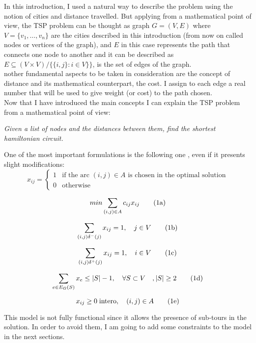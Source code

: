 In this introduction, I used a natural way to describe the problem using the notion of cities and distance travelled. But applying from a mathematical point of view, the TSP problem can be thought as graph $G=(V,E)$ where $V=\{v_1, \dots , v_n\}$ are the cities described in this introduction (from now on called nodes or vertices of the graph), and $E$ in this case represents the path that connects one node to another and it can be described as $E \subseteq (V \times V) / \{\{i, j\}	:i \in V\}\}$, is the set of edges of the graph.\\
nother fundamental aspects to be taken in consideration are the concept of distance and its mathematical counterpart, the cost. I assign to each edge a real number that will be used to give weight (or cost) to the path chosen.\\
Now that I have introduced the main concepts I can explain the TSP problem from a mathematical point of view:
\begin{displayquote}
	\textit{Given a list of nodes and the distances between them, find the shortest hamiltonian circuit.}
\end{displayquote}
One of the most important formulations is the following one \cite{ro1}, even if it presents slight modifications:
	\begin{equation}
	x_{ij}=
	\begin{cases}
	1 & \text{if the arc $(i, j) \in A$ is chosen in the optimal solution}\\
	0 & \text{otherwise}
	\end{cases}
	\end{equation}
	
	\begin{equation}
	\label{eqn:cost}
	min\sum_{(i,j)\in A}c_{ij}x_{ij}
	\stepcounter{equation}\tag{{\theequation}a}
	\end{equation}
	
	\begin{equation}
	\label{eqn:in}
	\sum_{(i,j)\delta^-(j)}x_{ij}=1, \quad j\in V
	\tag{{\theequation}b}
	\end{equation}
	
	\begin{equation}
	\label{eqn:out}
	\sum_{(i,j)\delta^+(j)}x_{ij}=1, \quad i\in V
	\tag{{\theequation}c}
	\end{equation}
	
	\begin{equation}
	\label{eqn:ragg}
	\sum_{e\in E_G(S)}x_{e}\le |S|-1, \quad \forall S \subset V\quad,|S|\ge 2
	\tag{{\theequation}d}
	\end{equation}
	
	\begin{equation}
	x_{ij}\ge 0 \; \text{intero} , \quad (i, j) \in A
	\tag{{\theequation}e}
	\end{equation}


This model is not fully functional since it allows the presence of sub-tours in the solution. In order to avoid them, I am going to add some constraints to the model in the next sections.